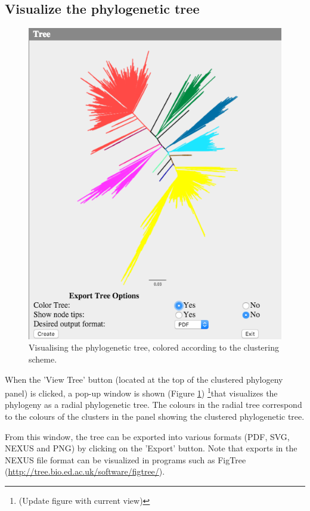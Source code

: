 \documentclass[a4paper, 11pt]{article} %
\begin{document}
\subsection{Visualize the phylogenetic tree}
\begin{figure}[H]
\centering
\includegraphics[scale=0.50]{images/view_tree.PNG}
\vspace{-0.25cm}
\caption{Visualising the phylogenetic tree, colored according to the clustering scheme.}
\label{fig:view_tree}
\end{figure}

When the 'View Tree' button (located at the top of the clustered phylogeny panel) is clicked, a pop-up window is shown (Figure \ref{fig:view_tree}) \footnote{(Update figure with current view)}that visualizes the phylogeny as a radial phylogenetic tree. 
The colours in the radial tree correspond to the colours of the clusters in the panel showing the clustered phylogenetic tree. %

From this window, the tree can be exported into various formats (PDF, SVG, NEXUS and PNG) by clicking on the 'Export' button. 
Note that exports in the NEXUS file format can be visualized in programs such as FigTree (\url{http://tree.bio.ed.ac.uk/software/figtree/}).  
\end{document}
